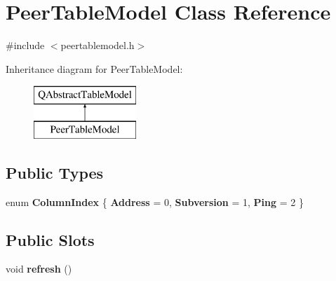 \hypertarget{class_peer_table_model}{}\section{Peer\+Table\+Model Class Reference}
\label{class_peer_table_model}


{\ttfamily \#include $<$peertablemodel.\+h$>$}

Inheritance diagram for Peer\+Table\+Model\+:\begin{figure}[H]
\begin{center}
\leavevmode
\includegraphics[height=2.000000cm]{class_peer_table_model}
\end{center}
\end{figure}
\subsection*{Public Types}
\begin{DoxyCompactItemize}
\item 
\mbox{\label{class_peer_table_model_a10a32ec5f31c9765c80b611760f7e590}} 
enum {\bfseries Column\+Index} \{ {\bfseries Address} = 0, 
{\bfseries Subversion} = 1, 
{\bfseries Ping} = 2
 \}
\end{DoxyCompactItemize}
\subsection*{Public Slots}
\begin{DoxyCompactItemize}
\item 
\mbox{\label{class_peer_table_model_abae14b3fd8a38a60f752f67a57b5b0b3}} 
void {\bfseries refresh} ()
\end{DoxyCompactItemize}
